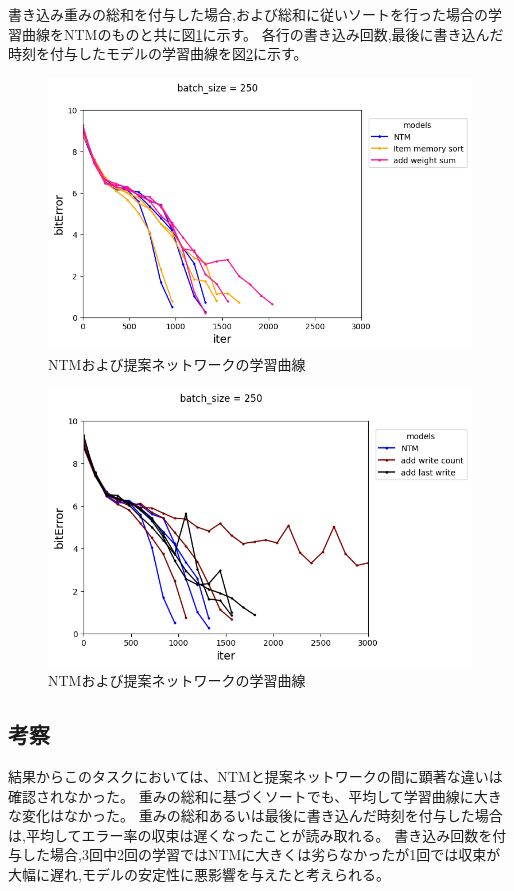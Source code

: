 書き込み重みの総和を付与した場合,および総和に従いソートを行った場合の学習曲線をNTMのものと共に図\ref{fig:ntm,sort,supple1}に示す。
各行の書き込み回数,最後に書き込んだ時刻を付与したモデルの学習曲線を図\ref{fig:ntm,supple2,3}に示す。
\begin{figure}[t]
	\centering
	\includegraphics[width=\linewidth]{./figure/associative/ntm,sort,supple1_m12.png}
	\caption{NTMおよび提案ネットワークの学習曲線}
	\label{fig:ntm,sort,supple1}
\end{figure}
\begin{figure}[t]
	\centering
	\includegraphics[width=\linewidth]{./figure/associative/ntm,supple2,3_m12.png}
	\caption{NTMおよび提案ネットワークの学習曲線}
	\label{fig:ntm,supple2,3}
\end{figure}

\subsection{考察}
結果からこのタスクにおいては、NTMと提案ネットワークの間に顕著な違いは確認されなかった。
重みの総和に基づくソートでも、平均して学習曲線に大きな変化はなかった。
重みの総和あるいは最後に書き込んだ時刻を付与した場合は,平均してエラー率の収束は遅くなったことが読み取れる。
書き込み回数を付与した場合,3回中2回の学習ではNTMに大きくは劣らなかったが1回では収束が大幅に遅れ,モデルの安定性に悪影響を与えたと考えられる。


